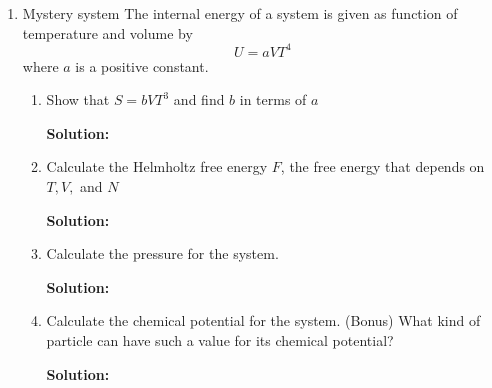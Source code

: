 \documentclass[10pt]{article}
\newenvironment{Solution}
    {\textbf{Solution:}
    
    \vspace{5mm}
    \begin{tcolorbox}
    }
    {
    \end{tcolorbox}
    \vspace{5mm}
    }
\begin{document}
\begin{enumerate}
\begin{enumerate}
\begin{Solution}
\end{Solution}

\item Consider an (idealized) four stroke engine (Otto motor) working with an ideal gas as a working medium. The (idealized) cycle is given in the figure below:
Determine the efficiency $\eta=\Delta W / \Delta Q$ of this cycle, where $\Delta W$ is the performed work, and $\Delta Q$ is the generated heat during combustion. Express the efficiency in terms of the compression ratio $V_{3} / V_{4}$ of the engine and the degrees of freedom $f$ of the working gas.
\begin{Solution}

\end{Solution}
\end{enumerate}
\newpage




\item Mystery system The internal energy of a system is given as function of temperature and volume by
$$
U=a V T^{4}
$$
where $a$ is a positive constant.
\begin{enumerate}
\item Show that $S=b V T^{3}$ and find $b$ in terms of $a$

\begin{Solution}

\end{Solution}

\item Calculate the Helmholtz free energy $F$, the free energy that depends on
$T, V,$ and $N$

\begin{Solution}

\end{Solution}

\item Calculate the pressure for the system.

\begin{Solution}

\end{Solution}

\item Calculate the chemical potential for the system. (Bonus) What kind of particle can have such a value for its chemical potential?

\begin{Solution}

\end{Solution}
    
\end{enumerate}
\end{enumerate}
\end{document}
